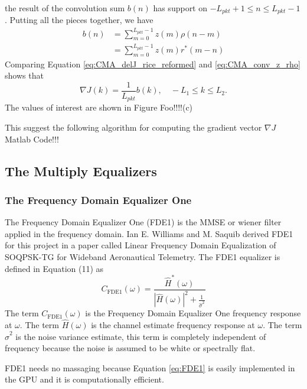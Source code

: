 the result of the convolution sum $b(n)$ has support on $-L_{pkt}+1 \leq n \leq L_{pkt}-1$.
Putting all the pieces together, we have
\begin{align}
b(n) &= \sum^{L_{pkt}-1}_{m=0} z(m) \rho(n-m) \nonumber \\
	 &= \sum^{L_{pkt}-1}_{m=0} z(m) r^\ast(m-n)
	 \label{eq:CMA_conv_z_rho}
\end{align}
Comparing Equation \eqref{eq:CMA_delJ_rice_reformed} and \eqref{eq:CMA_conv_z_rho} shows that 
\begin{equation}
\nabla J(k) = \frac{1}{L_{pkt}} b(k), \quad -L_1 \leq k \leq L_2.
\label{eq:CMA_delJ_donzo}
\end{equation}
The values of interest are shown in Figure Foo!!!!(c)

This suggest the following algorithm for computing the gradient vector $\nabla J$
Matlab Code!!!

\clearpage
\subsection{The Multiply Equalizers}

\subsubsection{The Frequency Domain Equalizer One}
The Frequency Domain Equalizer One (FDE1) is the MMSE or wiener filter applied in the frequency domain.
Ian E. Williams and M. Saquib derived FDE1 for this project in a paper called Linear Frequency Domain Equalization of SOQPSK-TG for Wideband Aeronautical Telemetry.
The FDE1 equalizer is defined in Equation (11) as
\begin{equation}
C_\text{FDE1}(\omega) = \frac{\hat{H}^\ast(\omega)}{|\hat{H}(\omega)|^2+\frac{1}{\hat{\sigma}^2}}
\label{eq:FDE1}
\end{equation}
The term $C_\text{FDE1}(\omega)$ is the Frequency Domain Equalizer One frequency response at $\omega$.
The term $\hat{H}(\omega)$ is the channel estimate frequency response at $\omega$.
The term $\hat{\sigma}^2$ is the noise variance estimate, this term is completely independent of frequency because the noise is assumed to be white or spectrally flat.

FDE1 needs no massaging because Equation \eqref{eq:FDE1} is easily implemented in the GPU and it is computationally efficient.

